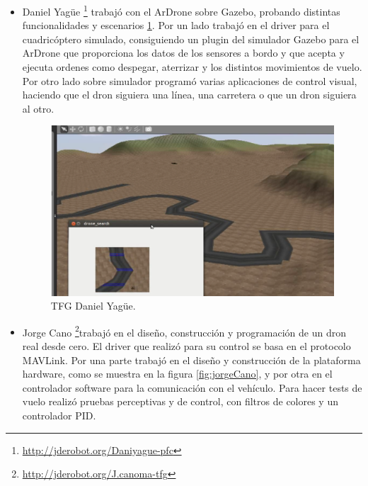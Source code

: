 \begin{itemize}
\item Daniel Yagüe\cite{danielYague} \footnote{\url{http://jderobot.org/Daniyague-pfc}} trabajó con el ArDrone sobre Gazebo, probando distintas funcionalidades y escenarios \ref{fig:daniYague}. Por un lado trabajó en el driver para el cuadricóptero simulado, consiguiendo un plugin del simulador Gazebo para el ArDrone que proporciona los datos de los sensores a bordo y que acepta y ejecuta ordenes como despegar, aterrizar y los distintos movimientos de vuelo. Por otro lado sobre simulador programó varias aplicaciones de control visual, haciendo que el dron siguiera una línea, una carretera o que un dron siguiera al otro.

\begin{figure}[H]
  \centering
  \includegraphics[scale=0.6]{imagenes/DaniYague.png}
  \caption{TFG Daniel Yagüe.}
  \label{fig:daniYague}
\end{figure}

\item Jorge Cano\cite{jorgeCano} \footnote{\url{http://jderobot.org/J.canoma-tfg}}trabajó en el diseño, construcción y programación de un dron real desde cero. El driver que realizó para su control se basa en el protocolo MAVLink. Por una parte trabajó en el diseño y construcción de la plataforma hardware, como se muestra en la figura \ref{fig:jorgeCano}, y por otra en el controlador software para la comunicación con el vehículo. Para hacer tests de vuelo realizó pruebas perceptivas y de control, con filtros de colores y un controlador PID.


\end{itemize}
